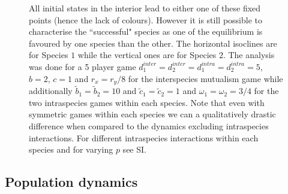\documentclass[12pt]{article}
\begin{document}
\begin{figure}
\begin{center}
{{All initial states in the interior lead to either one of these fixed points (hence the lack of colours).
However it is still possible to characterise the ``successful" species as one of the equilibrium is favoured by one species than the other.
The horizontal isoclines are for Species $1$ while the vertical ones are for Species $2$.
The analysis was done for a 5 player game $d_1^{inter} = d_2^{inter} = d_1^{intra} = d_2^{intra} = 5$, $b=2$, $c=1$ and $r_x = r_y /8$ for the interspecies mutualism game while additionally $\tilde{b}_1 = \tilde{b}_2 = 10$ and $\tilde{c}_1 = \tilde{c}_2 = 1$ and $\omega_1 = \omega_2 = 3/4$ for the two intraspecies games within each species. Note that even with symmetric games within each species we can a qualitatively drastic difference when compared to the dynamics excluding intraspecies interactions.  For different intraspecies interactions within each species and for varying $p$ see SI.}
\label{fig:mainexampleone}
}
\end{center}
\end{figure}

\subsection{Population dynamics}
\end{document}
